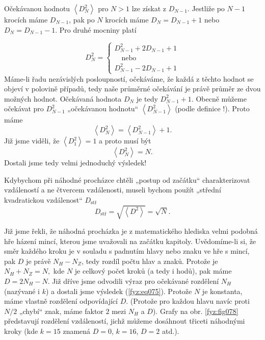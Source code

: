     Očekávanou hodnotu  \(\left\langle D_N^2\right\rangle\) pro \(N>1\) lze získat z \(D_{N-1}\). 
    Jestliže po \(N - 1\) krocích máme \(D_{N-1}\), pak po \(N\) krocích máme \(D_N = D_{N-1} + 1\) 
    nebo \(D_N = D_{N-1} - 1\). Pro druhé mocniny platí
    
    \begin{equation}\label{fyz:eq077}
      D_N^2 = 
        \begin{cases}
          D^2_{N-1} + 2D_{N-1} + 1 \\
          \quad\text{nebo}        \\
          D^2_{N-1} - 2D_{N-1} + 1
        \end{cases}
    \end{equation}
    Máme-li řadu nezávislých posloupností, očekáváme, že každá z těchto hodnot se objeví v polovině 
    případů, tedy naše průměrné očekávání je právě průměr ze dvou možných hodnot. Očekávaná hodnota 
    \(D_N\) je tedy \(D^2_{N-1} + 1\). Obecně můžeme očekávat pro \(D^2_{N-1}\) „očekávanou 
    hodnotu“  \(\left\langle D_{N-1}^2\right\rangle\) (podle definice !). Proto máme
    \begin{equation}\label{fyz:eq078}
      \left\langle D_N^2\right\rangle = \left\langle D_{N-1}^2\right\rangle + 1.
    \end{equation}
    Již jsme viděli, že \(\left\langle D_1^2\right\rangle = 1\) a proto musí být
    \begin{equation}\label{fyz:eq079}
      \left\langle D_N^2\right\rangle = N.
    \end{equation}
    Dostali jsme tedy velmi jednoduchý výsledek!
    
    Kdybychom při náhodné procházce chtěli „postup od začátku“ charakterizovat vzdáleností a ne 
    čtvercem vzdálenosti, museli bychom použít „střední kvadratickou vzdálenost“ \(D_{\text{stř}}\)
    \begin{equation}\label{fyz:eq080}
      D_{\text{stř}} = \sqrt{\left\langle D^2\right\rangle} = \sqrt{N}.
    \end{equation}
    
    Již jsme řekli, že náhodná procházka je z matematického hlediska velmi podobná hře házení 
    mincí, kterou jsme uvažovali na začátku kapitoly. Uvědomíme-li si, že směr každého kroku je v 
    souladu s padnutím hlavy nebo znaku ve hře s mincí, pak \(D\) je právě \(N_H - N_Z\), tedy 
    rozdíl počtu hlav a znaků. Protože je \(N_H + N_Z = N,\) kde \(N\) je celkový počet kroků (a 
    tedy i hodů), pak máme \(D = 2 N_H - N\). Již dříve jsme odvodili výraz pro očekávané rozdělení 
    \(N_H\) (nazývané i \(k\)) a dostali jsme výsledek (\ref{fyz:eq075}). Protože \(N\) je 
    konstanta, máme vlastně rozdělení odpovídající \(D\). (Protože pro každou hlavu navíc proti 
    \(N/2\) „chybí“ znak, máme faktor \(2\) mezi \(N_H\) a \(D\)). Grafy na obr. \ref{fyz:fig078} 
    představují rozdělení vzdáleností, jichž můžeme dosáhnout třiceti náhodnými kroky (kde \(k = 
    15\) znamená \(D = 0\), \(k= 16\), \(D = 2\) atd.).
    
